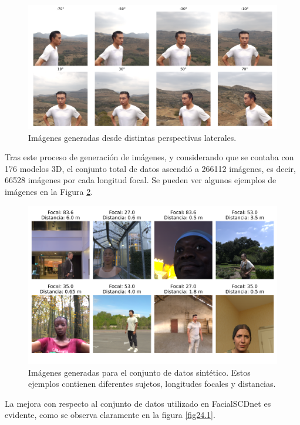 \begin{figure}[h]
	\centering
	\includegraphics[scale=0.4]{imagenes/cap4/imagenes_rotacion_horizontal.png}
	\caption[Ejemplos de imágenes rotadas horizontalmente.]{Imágenes generadas desde distintas perspectivas laterales.}
	\label{fig23}
\end{figure}

Tras este proceso de generación de imágenes, y considerando que se contaba con 176 modelos 3D, el conjunto total de datos ascendió a 266112 imágenes, es decir, 66528 imágenes por cada longitud focal. Se pueden ver algunos ejemplos de imágenes en la Figura \ref{fig24}.

\begin{figure}[h]
	\centering
	\includegraphics[scale=0.45]{imagenes/cap4/ejemplos_dataset.png}
	\caption[Ejemplos de imágenes generadas para el conjunto de datos.]{Imágenes generadas para el conjunto de datos sintético. Estos ejemplos contienen diferentes sujetos, longitudes focales y distancias.}
	\label{fig24}
\end{figure}

La mejora con respecto al conjunto de datos utilizado en FacialSCDnet \cite{14} es evidente, como se observa claramente en la figura \ref{fig24.1}.

